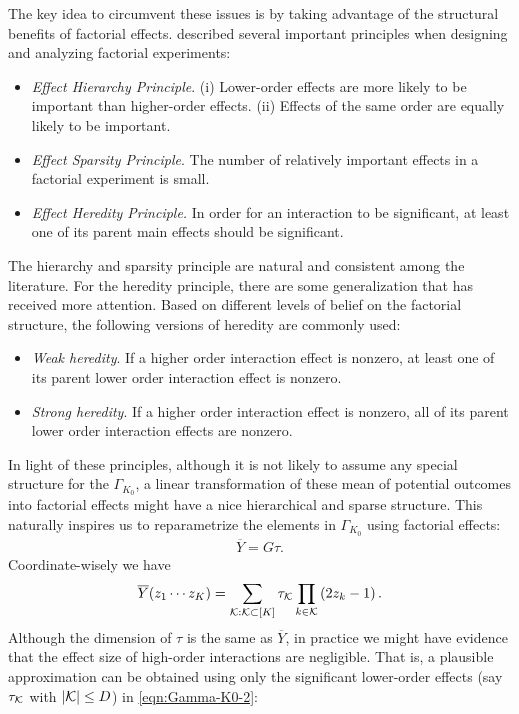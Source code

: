 \documentclass[12pt]{article}
\begin{document}
The key idea to circumvent these issues is by taking advantage of the structural benefits of factorial effects.  \cite{wu2011experiments} described several important principles when designing and analyzing factorial experiments:
\begin{itemize}
    \item \textit{Effect Hierarchy Principle}.
(i) Lower-order effects are more likely to be important than higher-order effects. (ii) Effects of the same order are equally likely to be important.
    \item \textit{Effect Sparsity Principle}.
The number of relatively important effects in a factorial experiment is small.
    \item \textit{Effect Heredity Principle.}
In order for an interaction to be significant, at least one of its parent main effects
should be significant. 
\end{itemize}
The hierarchy and sparsity principle are natural and consistent among the literature. For the heredity principle, there are some generalization that has received more attention. Based on different levels of belief on the factorial structure, the following versions of heredity are commonly used:
\begin{itemize}
    \item \textit{Weak heredity}. If a higher order interaction effect is nonzero, at least one of its parent lower order interaction effect is nonzero. 
    \item \textit{Strong heredity}. If a higher order interaction effect is nonzero, all of its parent lower order interaction effects are nonzero. 
\end{itemize}
In light of these principles, although it is not likely to assume any special structure for the $\Gamma_{K_0}$, a linear transformation of these mean of potential outcomes into factorial effects might have a nice hierarchical and sparse structure. This naturally inspires us to reparametrize the elements in $\Gamma_{K_0}$ using factorial effects:
\begin{align}\label{eqn:Y-equals-G-tau}
    \overline{Y} = G\tau.
\end{align}
Coordinate-wisely we have
\begin{align}\label{eqn:gamma-K-0}
    \overline{Y}(z_1\cdots z_K) = \sum_{{\mathcal{K}}:{\mathcal{K}}\subset [K]} \tau_{{\mathcal{K}}} \prod_{k\in {\mathcal{K}}}\left(2z_k - 1\right).
\end{align}
Although the dimension of $\tau$ is the same as $\overline{Y}$, in practice we might have evidence that the effect size of high-order interactions are negligible. That is, a plausible approximation can be obtained using only the significant lower-order effects (say $\tau_{\mathcal{K}}$ with $|{\mathcal{K}}|\le D$) in \eqref{eqn:Gamma-K0-2}:
\end{document}
